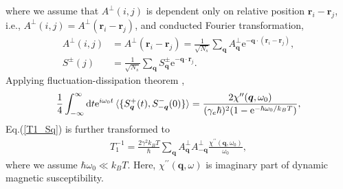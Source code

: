 where we assume that $A^\perp (i, j)$ is dependent only on relative position $\bm{r}_i - \bm{r}_j$, i.e., $A^\perp (i, j) = A^\perp(\bm{r}_i - \bm{r}_j)$,
and conducted Fourier transformation,
\begin{align}
A^\perp (i, j) &= A^\perp(\bm{r}_i - \bm{r}_j) = \frac{1}{\sqrt{N_s}}\sum_{\bm{q}}A^\perp_{\bm{q}}\mathrm{e}^{-\bm{q}\cdot(\bm{r}_i - \bm{r}_j)},\\
S^\pm (j) &= \frac{1}{\sqrt{N_s}}\sum_{\bm{q}} S^\pm_{\bm{q}}\mathrm{e}^{-\bm{q}\cdot\bm{r}_j}.
\end{align}
Applying fluctuation-dissipation theorem \cite{Kitaoka},
\begin{align}
\frac{1}{4}\int^{\infty}_{-\infty}\mathrm{d}t\mathrm{e}^{i\omega_0t} \braket{\{S^+_{\bm{q}}(t),S^-_{-\bm{q}}(0)\}}
= \frac{2\chi^{\prime\prime}(\bm{q}, \omega_0)}{(\gamma_e\hbar)^2(1-\mathrm{e}^{-\hbar\omega_0/k_BT})},
\end{align}
Eq.(\ref{T1_Sq}) is further transformed to
\begin{align}
\label{T1_chi}
T^{-1}_1 = \frac{2\gamma^2k_BT}{\hbar}\sum_{\bm{q}}A^{\perp}_{\bm{q}}A^\perp_{-\bm{q}} \frac{\chi^{\prime\prime}(\bm{q}, \omega_0)}{\omega_0},
\end{align}
where we assume $\hbar\omega_0 \ll k_BT$.
Here, $\chi^{\prime\prime}(\bm{q}, \omega)$ is imaginary part of dynamic magnetic susceptibility.
